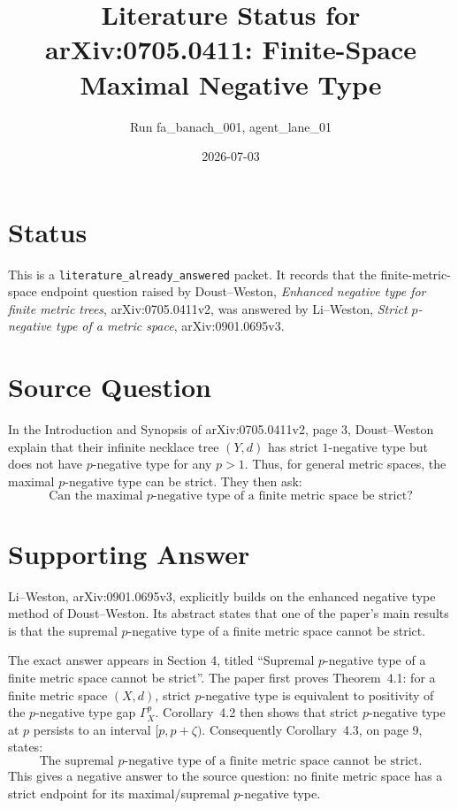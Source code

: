 \documentclass[11pt]{article}
\title{Literature Status for arXiv:0705.0411: Finite-Space Maximal Negative Type}
\author{Run fa\_banach\_001, agent\_lane\_01}
\date{2026-07-03}
\begin{document}
\maketitle

\section*{Status}

This is a \texttt{literature\_already\_answered} packet. It records that the
finite-metric-space endpoint question raised by Doust--Weston,
\emph{Enhanced negative type for finite metric trees}, arXiv:0705.0411v2, was
answered by Li--Weston, \emph{Strict \(p\)-negative type of a metric space},
arXiv:0901.0695v3.

\section*{Source Question}

In the Introduction and Synopsis of arXiv:0705.0411v2, page 3, Doust--Weston
explain that their infinite necklace tree \((Y,d)\) has strict
\(1\)-negative type but does not have \(p\)-negative type for any \(p>1\).
Thus, for general metric spaces, the maximal \(p\)-negative type can be
strict. They then ask:
\[
\text{Can the maximal \(p\)-negative type of a finite metric space be strict?}
\]

\section*{Supporting Answer}

Li--Weston, arXiv:0901.0695v3, explicitly builds on the enhanced negative
type method of Doust--Weston. Its abstract states that one of the paper's main
results is that the supremal \(p\)-negative type of a finite metric space
cannot be strict.

The exact answer appears in Section 4, titled ``Supremal \(p\)-negative type
of a finite metric space cannot be strict''. The paper first proves
Theorem~4.1: for a finite metric space \((X,d)\), strict \(p\)-negative type
is equivalent to positivity of the \(p\)-negative type gap
\(\Gamma_X^p\). Corollary~4.2 then shows that strict \(p\)-negative type at
\(p\) persists to an interval \([p,p+\zeta)\). Consequently Corollary~4.3,
on page 9, states:
\[
\text{The supremal \(p\)-negative type of a finite metric space cannot be strict.}
\]
This gives a negative answer to the source question: no finite metric space
has a strict endpoint for its maximal/supremal \(p\)-negative type.
\end{document}
